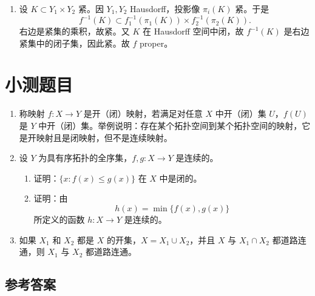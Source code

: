 \documentclass{article}
\begin{document}
\begin{enumerate}
\begin{enumerate}
          \item 设 $K\subset Y_1\times Y_2$ 紧。因 $Y_1,Y_2$ Hausdorff，投影像 $\pi_i(K)$ 紧。于是
                \[
                  f^{-1}(K)\subset f_1^{-1}(\pi_1(K))\times f_2^{-1}(\pi_2(K)).
                \]
                右边是紧集的乘积，故紧。又 $K$ 在 Hausdorff 空间中闭，故 $f^{-1}(K)$ 是右边紧集中的闭子集，因此紧。故 $f$ proper。
        \end{enumerate}
\end{enumerate}

\section{小测题目}

\begin{enumerate}
  \item 称映射 $f:X\to Y$ 是开（闭）映射，若满足对任意 $X$ 中开（闭）集 $U$，$f(U)$ 是 $Y$ 中开（闭）集。举例说明：存在某个拓扑空间到某个拓扑空间的映射，它是开映射且是闭映射，但不是连续映射。

  \item 设 $Y$ 为具有序拓扑的全序集，$f,g:X\to Y$ 是连续的。
        \begin{enumerate}
          \item 证明：$\{x:f(x)\le g(x)\}$ 在 $X$ 中是闭的。
          \item 证明：由
                \[
                  h(x)=\min\{f(x),g(x)\}
                \]
                所定义的函数 $h:X\to Y$ 是连续的。
        \end{enumerate}

  \item 如果 $X_1$ 和 $X_2$ 都是 $X$ 的开集，$X=X_1\cup X_2$，并且 $X$ 与 $X_1\cap X_2$ 都道路连通，则 $X_1$ 与 $X_2$ 都道路连通。
\end{enumerate}

\subsection*{参考答案}
\end{document}
